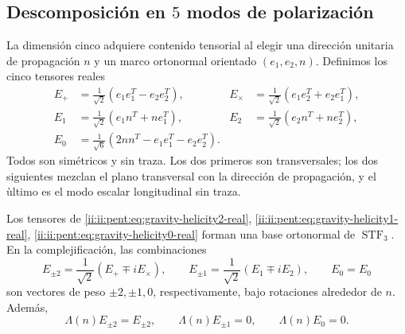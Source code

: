\subsection{Descomposición en \(5\) modos de polarización}

La dimensi\'on cinco adquiere contenido tensorial al elegir una direcci\'on
unitaria de propagaci\'on \(n\) y un marco ortonormal orientado
\((e_1,e_2,n)\). Definimos los cinco tensores reales
\begin{align}
E_{+}&=\frac1{\sqrt2}(e_1e_1^T-e_2e_2^T),
&E_{\times}&=\frac1{\sqrt2}(e_1e_2^T+e_2e_1^T),
\label{ii:ii:pent:eq:gravity-helicity2-real}\\
E_{1}&=\frac1{\sqrt2}(e_1n^T+ne_1^T),
&E_{2}&=\frac1{\sqrt2}(e_2n^T+ne_2^T),
\label{ii:ii:pent:eq:gravity-helicity1-real}\\
E_{0}&=\frac1{\sqrt6}(2nn^T-e_1e_1^T-e_2e_2^T).
\label{ii:ii:pent:eq:gravity-helicity0-real}
\end{align}
Todos son sim\'etricos y sin traza. Los dos primeros son transversales; los
dos siguientes mezclan el plano transversal con la direcci\'on de
propagaci\'on, y el \`ultimo es el modo escalar longitudinal sin traza.

\begin{theorem}
\label{ii:ii:pent:thm:gravity-five-helicities}
Los tensores de
\eqref{ii:ii:pent:eq:gravity-helicity2-real}, \eqref{ii:ii:pent:eq:gravity-helicity1-real}, \eqref{ii:ii:pent:eq:gravity-helicity0-real}
forman una base ortonormal de \(\operatorname{STF}_3\). En la
complejificaci\'on, las combinaciones
\begin{equation}
\label{ii:ii:pent:eq:gravity-complex-helicities}
E_{\pm2}=\frac1{\sqrt2}(E_+\mp i E_\times),
\qquad
E_{\pm1}=\frac1{\sqrt2}(E_1\mp i E_2),
\qquad E_0=E_0
\end{equation}
son vectores de peso \(\pm2,\pm1,0\), respectivamente, bajo rotaciones
alrededor de \(n\). Adem\'as,
\begin{equation}
\label{ii:ii:pent:eq:gravity-tt-on-five}
\Lambda(n)E_{\pm2}=E_{\pm2},
\qquad
\Lambda(n)E_{\pm1}=0,
\qquad
\Lambda(n)E_0=0.
\end{equation}
\end{theorem}

